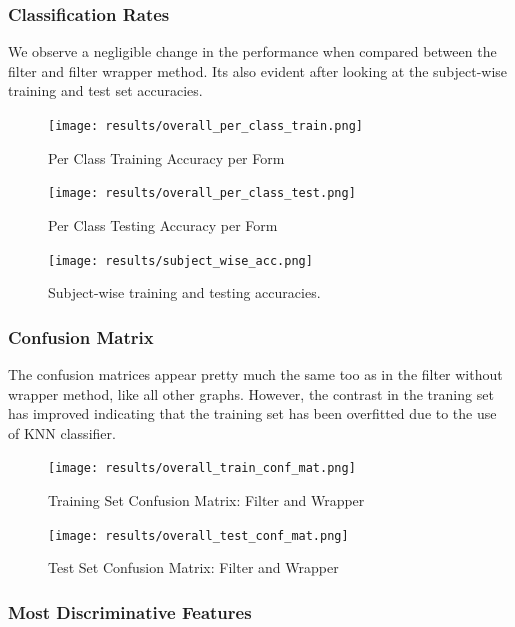 \documentclass[12pt,twoside,a4paper]{article}
\begin{document}
\subsubsection*{Classification Rates}

We observe a negligible change in the performance when compared between the filter and filter wrapper method. Its also evident after looking at the subject-wise training and test set accuracies. 

\begin{figure}[H]
    \centering
    \texttt{[image: results/overall\_per\_class\_train.png]}
    \caption{Per Class Training Accuracy per Form}
    \label{fig: FW1}
\end{figure}

\begin{figure}[H]
    \centering
    \texttt{[image: results/overall\_per\_class\_test.png]}
    \caption{Per Class Testing Accuracy per Form}
    \label{fig: FW2}
\end{figure}

\begin{figure}[H]
    \centering
    \texttt{[image: results/subject\_wise\_acc.png]}
    \caption{Subject-wise training and testing accuracies.}
    \label{fig: FW3}
\end{figure}

\subsubsection*{Confusion Matrix}

The confusion matrices appear pretty much the same too as in the filter without wrapper method, like all other graphs. However, the contrast in the traning set has improved indicating that the training set has been overfitted due to the use of KNN classifier.

\begin{figure}[H]
    \centering
    \texttt{[image: results/overall\_train\_conf\_mat.png]}
    \caption{Training Set Confusion Matrix: Filter and Wrapper}
    \label{fig: FW4}
\end{figure}

\begin{figure}[H]
    \centering
    \texttt{[image: results/overall\_test\_conf\_mat.png]}
    \caption{Test Set Confusion Matrix: Filter and Wrapper}
    \label{fig: FW5}
\end{figure}

\subsubsection*{Most Discriminative Features}
\end{document}
